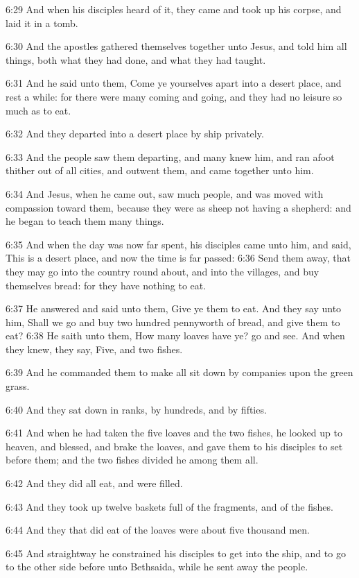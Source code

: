 6:29 And when his disciples heard of it, they came and took up his corpse, and laid it in a tomb.

6:30 And the apostles gathered themselves together unto Jesus, and told him all things, both what they had done, and what they had taught.

6:31 And he said unto them, Come ye yourselves apart into a desert place, and rest a while: for there were many coming and going, and they had no leisure so much as to eat.

6:32 And they departed into a desert place by ship privately.

6:33 And the people saw them departing, and many knew him, and ran afoot thither out of all cities, and outwent them, and came together unto him.

6:34 And Jesus, when he came out, saw much people, and was moved with compassion toward them, because they were as sheep not having a shepherd: and he began to teach them many things.

6:35 And when the day was now far spent, his disciples came unto him, and said, This is a desert place, and now the time is far passed: 6:36 Send them away, that they may go into the country round about, and into the villages, and buy themselves bread: for they have nothing to eat.

6:37 He answered and said unto them, Give ye them to eat. And they say unto him, Shall we go and buy two hundred pennyworth of bread, and give them to eat?  6:38 He saith unto them, How many loaves have ye?  go and see. And when they knew, they say, Five, and two fishes.

6:39 And he commanded them to make all sit down by companies upon the green grass.

6:40 And they sat down in ranks, by hundreds, and by fifties.

6:41 And when he had taken the five loaves and the two fishes, he looked up to heaven, and blessed, and brake the loaves, and gave them to his disciples to set before them; and the two fishes divided he among them all.

6:42 And they did all eat, and were filled.

6:43 And they took up twelve baskets full of the fragments, and of the fishes.

6:44 And they that did eat of the loaves were about five thousand men.

6:45 And straightway he constrained his disciples to get into the ship, and to go to the other side before unto Bethsaida, while he sent away the people.

